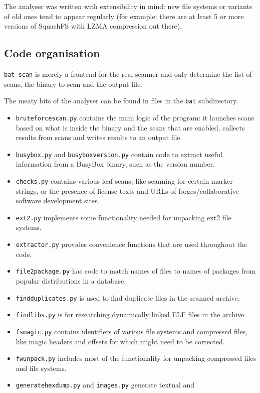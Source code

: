 \documentclass[10pt]{article}
\begin{document}
The analyser was written with extensibility in mind: new file systems or
variants of old ones tend to appear regularly (for example: there are at
least 5 or more versions of SquashFS with LZMA compression out there).

\subsection{Code organisation}

\texttt{bat-scan} is merely a frontend for the real scanner and only determine
the list of scans, the binary to scan and the output file.

The meaty bits of the analyser can be found in files in the \texttt{bat}
subdirectory.

\begin{itemize}
\item \texttt{bruteforcescan.py} contains the main logic of the program: it
launches scans based on what is inside the binary and the scans that are
enabled, collects results from scans and writes results to an output file.
\item \texttt{busybox.py} and \texttt{busyboxversion.py} contain code to
extract useful information from a BusyBox binary, such as the version number.
\item \texttt{checks.py} contains various leaf scans, like scanning for certain
marker strings, or the presence of license texts and URLs of
forges/collaborative software development sites.
\item \texttt{ext2.py} implements some functionality needed for unpacking ext2
file systems.
\item \texttt{extractor.py} provides convenience functions that are used
throughout the code.
\item \texttt{file2package.py} has code to match names of files to names of
packages from popular distributions in a database.
\item \texttt{findduplicates.py} is used to find duplicate files in the scanned
archive.
\item \texttt{findlibs.py} is for researching dynamically linked ELF files in
the archive.
\item \texttt{fsmagic.py} contains identifiers of various file systems and
compressed files, like magic headers and offsets for which might need to be
corrected.
\item \texttt{fwunpack.py} includes most of the functionality for unpacking
compressed files and file systems.
\item \texttt{generatehexdump.py} and \texttt{images.py} generate textual and

\end{itemize}
\end{document}
